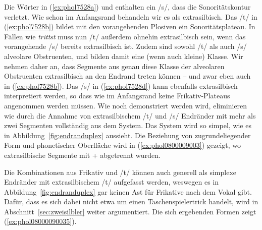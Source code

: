 Die Wörter in (\ref{ex:phol7528a}) und enthalten ein /s/, dass die Sonoritätskontur verletzt.
Wie schon im Anfangsrand behandeln wir es als extrasilbisch.
Das /t/ in (\ref{ex:phol7528b}) bildet mit den vorangehenden Plosiven ein Sonoritätsplateau.
In Fällen wie \textit{trittst} muss nun /t/ außerdem ohnehin extrasilbisch sein, wenn das vorangehende /s/ bereits extrasilbisch ist.
Zudem sind sowohl /t/ als auch /s/ alveolare Obstruenten, und bilden damit eine (wenn auch kleine) Klasse.
Wir nehmen daher an, dass Segmente aus genau diese Klasse der alveolaren Obstruenten extrasilbisch an den Endrand treten können -- und zwar eben auch in (\ref{ex:phol7528b}).
Das /s/ in (\ref{ex:phol7528d}) kann ebenfalls extrasilbisch interpretiert werden, so dass wie im Anfangsrand keine Frikativ-Plateaus angenommen werden müssen.
Wie noch demonstriert werden wird, eliminieren wie durch die Annahme von extrasilbischem /t/ und /s/ Endränder mit mehr als zwei Segmenten vollständig aus dem System.
Das System wird so simpel, wie es in Abbildung~\ref{fig:endranduplex} aussieht.
Die Beziehung von zugrundeliegender Form und phonetischer Oberfläche wird in (\ref{ex:phol0800009003}) gezeigt, wo extrasilbische Segmente mit + abgetrennt wurden.

\begin{exe}
  \ex \label{ex:phol0800009003}
  \begin{xlist}
  \end{xlist}
\end{exe}

Die Kombinationen aus Frikativ und /t/ können auch generell als simplexe Endränder mit extrasilbischem /t/ aufgefasst werden, weswegen es in Abbildung~\ref{fig:endranduplex} gar keinen Ast für Frikative nach dem Vokal gibt.
Dafür, dass es sich dabei nicht etwa um einen Taschenspielertrick handelt, wird in Abschnitt~\ref{sec:zweisilbler} weiter argumentiert.
Die sich ergebenden Formen zeigt (\ref{ex:phol08000090035}).

